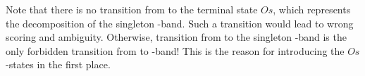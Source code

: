 \documentclass[11pt]{article} %
\newcommand{\Ob}{\text{O}}
\newcommand{\Mb}{\text{M}}
\newcommand{\PKnone}{P\!K}
\newcommand{\constrIO} {_\text{O}}
\newcommand{\constrIL} {_\text{L}}
\newcommand{\constrIIO}{_\text{O}}
\newcommand{\constrIIR}{_\text{R}}
\begin{document}
%
%
%
%
%
%
%
%
%
%
%

Note that there is no transition from \Mb{} to the terminal state $Os$, which represents the decomposition of the singleton \Ob-band. Such a transition would lead to wrong scoring and ambiguity. Otherwise, transition from \Mb{} to the singleton \Ob-band is the only forbidden transition from \Mb{} to \Ob-band! This is the reason for introducing the $Os$-states in the first place.  
\end{document}

